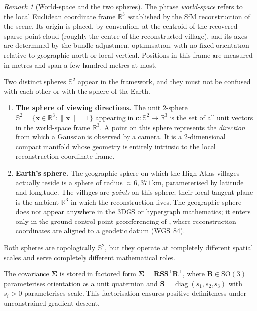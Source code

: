 \documentclass[11pt,a4paper]{article}
\theoremstyle{plain}
\theoremstyle{definition}
\theoremstyle{remark}
\newtheorem{remark}[theorem]{Remark}
\newcommand{\diag}{\operatorname{diag}}
\newcommand{\SO}{\mathrm{SO}}
\begin{document}
\begin{remark}[World-space and the two spheres]
\label{rem:worldspace}
The phrase \emph{world-space} refers to the local Euclidean coordinate
frame $\mathbb{R}^3$ established by the SfM reconstruction of the
scene. Its origin is placed, by convention, at the centroid of the
recovered sparse point cloud (roughly the centre of the reconstructed
village), and its axes are determined by the bundle-adjustment
optimisation, with no fixed orientation relative to geographic north or
local vertical. Positions in this frame are measured in metres and span
a few hundred metres at most.

Two distinct spheres $\mathbb{S}^2$ appear in the framework, and they
must not be confused with each other or with the sphere of the Earth.
\begin{enumerate}[leftmargin=2em]
  \item \textbf{The sphere of viewing directions.} The unit 2-sphere
    $\mathbb{S}^2 = \{\mathbf{x} \in \mathbb{R}^3 : \|\mathbf{x}\| = 1\}$
    appearing in $\mathbf{c} : \mathbb{S}^2 \to \mathbb{R}^3$ is the
    set of all unit vectors in the world-space frame $\mathbb{R}^3$.
    A point on this sphere represents the \emph{direction} from which
    a Gaussian is observed by a camera. It is a 2-dimensional compact
    manifold whose geometry is entirely intrinsic to the local
    reconstruction coordinate frame.
  \item \textbf{Earth's sphere.} The geographic sphere on which the
    High Atlas villages actually reside is a sphere of radius
    $\approx 6{,}371\,\mathrm{km}$, parameterised by latitude and
    longitude. The villages are \emph{points} on this sphere; their
    local tangent plane is the ambient $\mathbb{R}^3$ in which the
    reconstruction lives. The geographic sphere does not appear
    anywhere in the 3DGS or hypergraph mathematics; it enters only
    in the ground-control-point georeferencing of
    , where reconstruction coordinates are
    aligned to a geodetic datum (WGS~84).
\end{enumerate}
Both spheres are topologically $\mathbb{S}^2$, but they operate at
completely different spatial scales and serve completely different
mathematical roles.
\end{remark}

\noindent
The covariance ${\boldsymbol\Sigma}$ is stored in factored form
${\boldsymbol\Sigma} = \mathbf{R}\mathbf{S}\mathbf{S}^\top\mathbf{R}^\top$,
where $\mathbf{R} \in \SO(3)$ parameterises orientation as a unit
quaternion and $\mathbf{S} = \diag(s_1, s_2, s_3)$ with $s_i > 0$
parameterises scale. This factorisation ensures positive definiteness
under unconstrained gradient descent.
\end{document}
